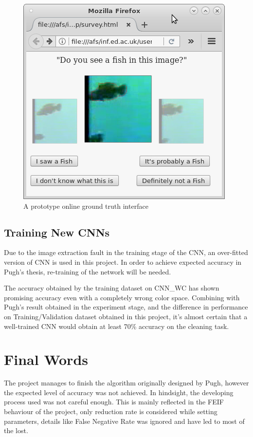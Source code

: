 \documentclass[bsc,logo,twoside,fullspacing,parskip]{infthesis}
\begin{document}
\begin{figure}[!h]
    \centering
    \includegraphics[scale=0.38]{graph/query.png}
    \caption{A prototype online ground truth interface}
    \label{fig:gto}
\end{figure}

\subsection{Training New CNNs}

Due to the image extraction fault in the training stage of the CNN, an over-fitted version of CNN is used in this project. 
In order to achieve expected accuracy in Pugh's thesis\cite{Pugh}, re-training of the network will be needed.

The accuracy obtained by the training dataset on CNN\_WC has shown promising accuracy even with a completely wrong color space. Combining with Pugh's result obtained in the experiment stage, and the difference in performance on Training/Validation dataset obtained in this project, it's almost certain that a well-trained CNN would obtain at least 70\% accuracy on the cleaning task. 

\section{Final Words}

The project manages to finish the algorithm originally designed by Pugh, however the expected level of accuracy was not achieved.
In hindsight, the developing process used was not careful enough. 
This is mainly reflected in the FEIF behaviour of the project, only reduction rate is considered while setting parameters, details like False Negative Rate was ignored and have led to most of the lost.
\end{document}
